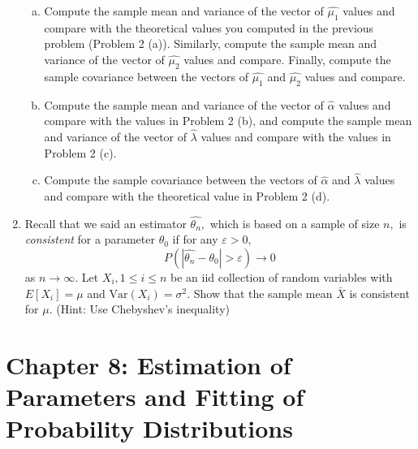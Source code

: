 \documentclass{article}
\newcommand{\var}{\mathrm{Var}}
\begin{document}
\begin{enumerate}
\begin{enumerate}[a)]
			\item Compute the sample mean and variance of the vector of $\hat{\mu_1}$ values and compare with the theoretical values you computed in the previous problem (Problem 2 (a)). Similarly, compute the sample mean and variance of the vector of $\hat{\mu_2}$ values and compare. Finally, compute the sample covariance between the vectors of $\hat{\mu_1}$ and $\hat{\mu_2}$ values and compare.

			\item Compute the sample mean and variance of the vector of $\hat{\alpha}$ values and compare with the values in Problem 2 (b), and compute the sample mean and variance of the vector of $\hat{\lambda}$ values and compare with the values in Problem 2 (c).

			\item Compute the sample covariance between the vectors of $\hat{\alpha}$ and $\hat{\lambda}$ values and compare with the theoretical value in Problem 2 (d).
				
		\end{enumerate}

	\item Recall that we said an estimator $\hat{\theta_n},$ which is based on a sample of size $n,$ is \textit{consistent} for a parameter $\theta_0$ if for any $\varepsilon>0,$ \[P\left( |\hat{\theta_n}-\theta_0| > \varepsilon \right)\to 0\] as $n\to\infty.$ Let $X_i, 1\le i\le n$ be an iid collection of random variables with $E[X_i]=\mu$ and $\var(X_i)=\sigma^2.$ Show that the sample mean $\bar{X}$ is consistent for $\mu$. (Hint: Use Chebyshev's inequality)

\end{enumerate}

\section*{Chapter 8: Estimation of Parameters and Fitting of Probability Distributions}
\end{document}
